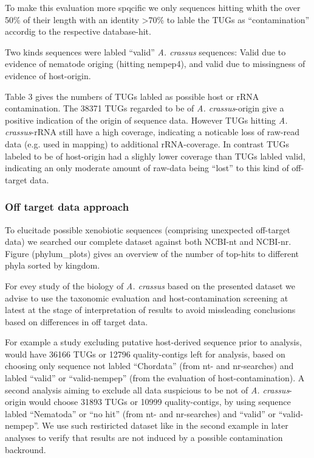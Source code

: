 \documentclass[10pt]{bmc_article}
\newenvironment{bmcformat}{\begin{raggedright}\baselineskip20pt\sloppy\setboolean{publ}{false}}{\end{raggedright}\baselineskip20pt\sloppy}
\begin{document}
\begin{bmcformat}
To make this evaluation more spqcific we only sequences hitting whith
the over 50\% of their length with an identity >70\% to lable the
TUGs as ``contamination'' accordig to the respective database-hit.

Two kinds sequences were labled ``valid'' \textit{A. crassus}
sequences: Valid due to evidence of nematode origing (hitting
nempep4), and valid due to missingness of evidence of host-origin.


Table 3 gives the numbers of TUGs labled as possible host or rRNA
contamination. The 38371 TUGs regarded to be of
\textit{A. crassus}-origin give a positive indication of the origin of
sequence data. However TUGs hitting \textit{A. crassus}-rRNA still
have a high coverage, indicating a noticable loss of raw-read data
(e.g. used in mapping) to additional rRNA-coverage. In contrast
TUGs labeled to be of host-origin had a slighly lower coverage than
TUGs labled valid, indicating an only moderate amount of raw-data
being ``lost'' to this kind of off-target data.

\subsubsection*{Off target data approach}

To elucitade possible xenobiotic sequences (comprising unexpected
off-target data) we searched our complete dataset against both NCBI-nt
and NCBI-nr. Figure (phylum\_plots) gives an overview of the number of
top-hits to different phyla sorted by kingdom.

For evey study of the biology of \textit{A. crassus} based on the
presented dataset we advise to use the taxonomic evaluation and
host-contamination screening at latest at the stage of interpretation
of results to avoid missleading conclusions based on differences in
off target data.

For example a study excluding putative host-derived sequence prior to
analysis, would have 36166 TUGs or 12796
quality-contigs left for analysis, based on choosing only sequence not
labled ``Chordata'' (from nt- and nr-searches) and labled ``valid'' or
``valid-nempep'' (from the evaluation of host-contamination). A second
analysis aiming to exclude all data suspicious to be not of
\textit{A. crassus}-origin would choose 31893 TUGs or
10999 quality-contigs, by using sequence labled
``Nematoda'' or ``no hit'' (from nt- and nr-searches) and ``valid'' or
``valid-nempep''. We use such restiricted dataset like in the second
example in later analyses to verify that results are not induced by a
possible contamination backround.


\end{bmcformat}
\end{document}
